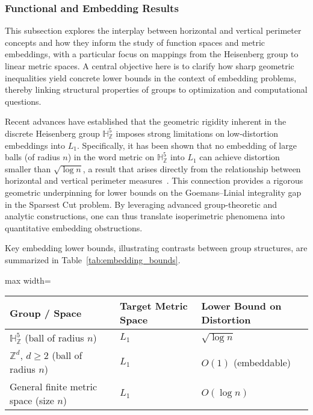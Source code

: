 \documentclass[sigconf]{acmart}
\begin{document}
\subsubsection{Functional and Embedding Results}

This subsection explores the interplay between horizontal and vertical perimeter concepts and how they inform the study of function spaces and metric embeddings, with a particular focus on mappings from the Heisenberg group to linear metric spaces. A central objective here is to clarify how sharp geometric inequalities yield concrete lower bounds in the context of embedding problems, thereby linking structural properties of groups to optimization and computational questions.

Recent advances have established that the geometric rigidity inherent in the discrete Heisenberg group $\mathbb{H}^5_{\mathbb{Z}}$ imposes strong limitations on low-distortion embeddings into $L_1$. Specifically, it has been shown that no embedding of large balls (of radius $n$) in the word metric on $\mathbb{H}^5_{\mathbb{Z}}$ into $L_1$ can achieve distortion smaller than $\sqrt{\log n}$, a result that arises directly from the relationship between horizontal and vertical perimeter measures~\cite{ref108}. This connection provides a rigorous geometric underpinning for lower bounds on the Goemans–Linial integrality gap in the Sparsest Cut problem. By leveraging advanced group-theoretic and analytic constructions, one can thus translate isoperimetric phenomena into quantitative embedding obstructions.

Key embedding lower bounds, illustrating contrasts between group structures, are summarized in Table~\ref{tab:embedding_bounds}.

\begin{table*}[htbp]
\centering
\caption{Representative lower bounds for embedding finite metric spaces or group balls into $L_1$ with low distortion. See Section~4.2 for details and references.}
\label{tab:embedding_bounds}
\begin{adjustbox}{max width=\textwidth}
\begin{tabular}{lll}
\toprule
\textbf{Group / Space} & \textbf{Target Metric Space} & \textbf{Lower Bound on Distortion}\\
\midrule
$\mathbb{H}^5_{\mathbb{Z}}$ (ball of radius $n$) & $L_1$ & $\sqrt{\log n}$\\
$\mathbb{Z}^d$, $d\geq 2$ (ball of radius $n$) & $L_1$ & $O(1)$ (embeddable)\\
General finite metric space (size $n$) & $L_1$ & $O(\log n)$\\
\bottomrule
\end{tabular}
\end{adjustbox}
\end{table*}
\end{document}
